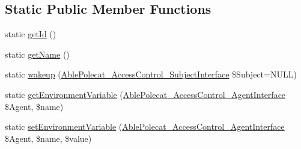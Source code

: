 \subsection*{Static Public Member Functions}
\begin{DoxyCompactItemize}
\item 
static \hyperlink{class_able_polecat___mode___application_acfaa3a96d0cb5a4c0d4d710dcba41e9e}{get\+Id} ()
\item 
static \hyperlink{class_able_polecat___mode___application_a4ef9bd37ba3ce8a13c1e8bcf4f72a630}{get\+Name} ()
\item 
static \hyperlink{class_able_polecat___mode___application_a3f2135f6ad45f51d075657f6d20db2cd}{wakeup} (\hyperlink{interface_able_polecat___access_control___subject_interface}{Able\+Polecat\+\_\+\+Access\+Control\+\_\+\+Subject\+Interface} \$Subject=N\+U\+L\+L)
\item 
static \hyperlink{class_able_polecat___mode___application_a04e7e0f41da8037ae797868b61b6df77}{get\+Environment\+Variable} (\hyperlink{interface_able_polecat___access_control___agent_interface}{Able\+Polecat\+\_\+\+Access\+Control\+\_\+\+Agent\+Interface} \$Agent, \$name)
\item 
static \hyperlink{class_able_polecat___mode___application_a68bdefd00518f09963ea3fa95cd2a242}{set\+Environment\+Variable} (\hyperlink{interface_able_polecat___access_control___agent_interface}{Able\+Polecat\+\_\+\+Access\+Control\+\_\+\+Agent\+Interface} \$Agent, \$name, \$value)
\end{DoxyCompactItemize}
